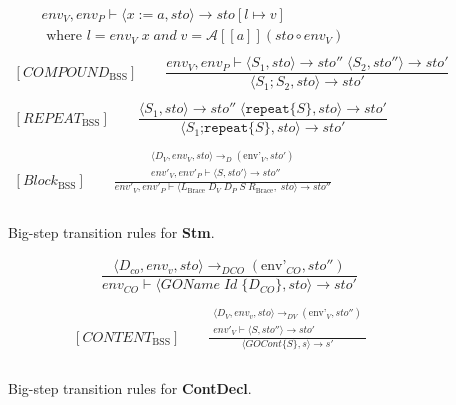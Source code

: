 \begin{figure}[htbp]
	\centering
	\begin{gather*}
		[ASSIGNMENT_\text{BSS}] 
		\qquad env_V, env_P \vdash \langle x:=a,sto\rangle \rightarrow sto[l\mapsto v] \\
		\qquad \text{ where } l = env_V \; x \; and \; v = \mathcal{A}[\![a]\!](sto\circ env_V )
		\\
		\\
		[COMPOUND_\text{BSS}] 
		\qquad \dfrac
		{env_V, env_P \vdash \langle S_1, sto \rangle \rightarrow sto'' \;\langle S_2, sto'' \rangle \rightarrow sto'}
		{\langle S_1;S_2,sto \rangle\rightarrow sto'}
		\\
		\\
		[REPEAT_\text{BSS}] 
		\qquad \dfrac
		{\langle S_1, sto \rangle \rightarrow sto'' \;\langle \texttt{repeat} \{S\}, sto \rangle \rightarrow sto'}
		{\langle S_1 \texttt{;repeat} \{S\}, sto \rangle\rightarrow sto'}
		\\
		\\
		[Block_\text{BSS}] 
		\qquad \frac
		{
			\begin{gathered}
				\langle D_V, env_V, sto\rangle \rightarrow_{D} (\text{env'}_V, sto') \\ 
				env'_V, env'_P \vdash \langle S, sto'\rangle \rightarrow sto''
			\end{gathered}
		}
		{env'_V, env'_P \vdash \langle L_\text{Brace} \; D_V \; D_P \; S \; R_\text{Brace}, \; sto\rangle\rightarrow sto''}
		\\
		\\
	\end{gather*}
	\caption{Big-step transition rules for \textbf{Stm}.}
	\label{fig:BssStm}
\end{figure}

\begin{figure}[htbp]
	\centering
	\begin{gather*}
		[GAMEOBJECT_\text{BSS}] 
		\qquad \dfrac
		{\langle D_{co}, env_v, sto\rangle \rightarrow_{DCO} (\text{env'}_{CO}, sto'')}
		{env_{CO} \vdash \langle GOName \; Id \; \{D_{CO}\}, sto\rangle\rightarrow sto'}
		\\
		\\
		[CONTENT_\text{BSS}] 
		\qquad \frac
		{
			\begin{gathered}
				\langle D_V, env_v, sto\rangle \rightarrow_{DV} (\text{env'}_V, sto'') \\ 
				env'_V \vdash \langle S, sto''\rangle \rightarrow sto'
			\end{gathered}
		}
		{\langle GOCont \{S\}, s\rangle\rightarrow s'}
		\\
		\\
	\end{gather*}
	\caption{Big-step transition rules for \textbf{ContDecl}.}
	\label{fig:BssStm}
\end{figure}


